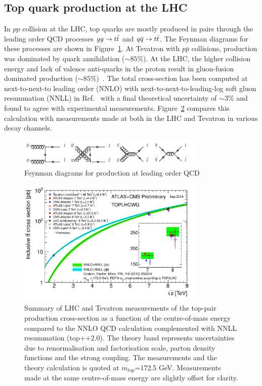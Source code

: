 \subsection{Top quark production at the LHC}

In $pp$ collision at the LHC, top quarks are mostly produced in pairs through the leading order QCD processes  $gg \rightarrow t\bar{t}$ and $q\bar{q} \rightarrow t\bar{t}$. The Feynman diagrams for these processes are shown in Figure~\ref{fig:ttdiag}. At Tevatron with $p\bar{p}$ collisions, \ttbar production was dominated by quark annihilation ($\sim 85$\%). At the LHC, the higher collision energy and lack of valence anti-quarks in the proton result in gluon-fusion dominated \ttbar production ($\sim 85$\%)~\cite{PDG}. The total \ttbar cross-section has been computed at next-to-next-to leading order (NNLO) with next-to-next-to-leading-log soft gluon resummation (NNLL) in Ref.~\cite{Czakon:2013goa} with a final theoretical uncertainty of $\sim 3 \%$ and found to agree with experimental measurements. Figure~\ref{fig:ttxsec} compares this calculation with measurements made at both in the LHC and Tevatron in various decay channels.

\begin{figure}
\centering
\includegraphics[width=0.8\textwidth]{fig/thry/fig_ttbar.png}
\caption{Feynman diagrams for \ttbar production at leading order QCD}
\label{fig:ttdiag}
\end{figure}

\begin{figure}
\centering
\includegraphics[width=0.8\textwidth]{fig/thry/tt_xsec_vsroots.pdf}
\caption{Summary of LHC and Tevatron measurements of the top-pair production cross-section as a function of the centre-of-mass energy compared to the NNLO QCD calculation complemented with NNLL resummation (top++2.0). The theory band represents uncertainties due to renormalisation and factorisation scale, parton density functions and the strong coupling. The measurements and the theory calculation is quoted at $m_{top}$=172.5 GeV. Measurements made at the same centre-of-mass energy are slightly offset for clarity.}
\label{fig:ttxsec}
\end{figure}


